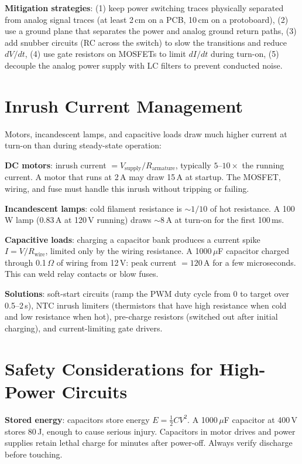 \documentclass[11pt,letterpaper,twoside,openany]{book}
\begin{document}
\textbf{Mitigation strategies}: (1) keep power switching traces physically separated from analog signal traces (at least 2\,cm on a PCB, 10\,cm on a protoboard), (2) use a ground plane that separates the power and analog ground return paths, (3) add snubber circuits (RC across the switch) to slow the transitions and reduce $dV/dt$, (4) use gate resistors on MOSFETs to limit $dI/dt$ during turn-on, (5) decouple the analog power supply with LC filters to prevent conducted noise.

\section{Inrush Current Management}
Motors, incandescent lamps, and capacitive loads draw much higher current at turn-on than during steady-state operation:

\textbf{DC motors}: inrush current $= V_{\text{supply}} / R_{\text{armature}}$, typically $5$--$10\times$ the running current. A motor that runs at 2\,A may draw 15\,A at startup. The MOSFET, wiring, and fuse must handle this inrush without tripping or failing.

\textbf{Incandescent lamps}: cold filament resistance is $\sim$$1/10$ of hot resistance. A 100\,W lamp (0.83\,A at 120\,V running) draws $\sim$8\,A at turn-on for the first 100\,ms.

\textbf{Capacitive loads}: charging a capacitor bank produces a current spike $I = V/R_{\text{wire}}$, limited only by the wiring resistance. A 1000\,$\mu$F capacitor charged through 0.1\,$\Omega$ of wiring from 12\,V: peak current $= 120$\,A for a few microseconds. This can weld relay contacts or blow fuses.

\textbf{Solutions}: soft-start circuits (ramp the PWM duty cycle from 0 to target over 0.5--2\,s), NTC inrush limiters (thermistors that have high resistance when cold and low resistance when hot), pre-charge resistors (switched out after initial charging), and current-limiting gate drivers.

\section{Safety Considerations for High-Power Circuits}
\textbf{Stored energy}: capacitors store energy $E = \frac{1}{2}CV^2$. A 1000\,$\mu$F capacitor at 400\,V stores 80\,J, enough to cause serious injury. Capacitors in motor drives and power supplies retain lethal charge for minutes after power-off. Always verify discharge before touching.
\end{document}
